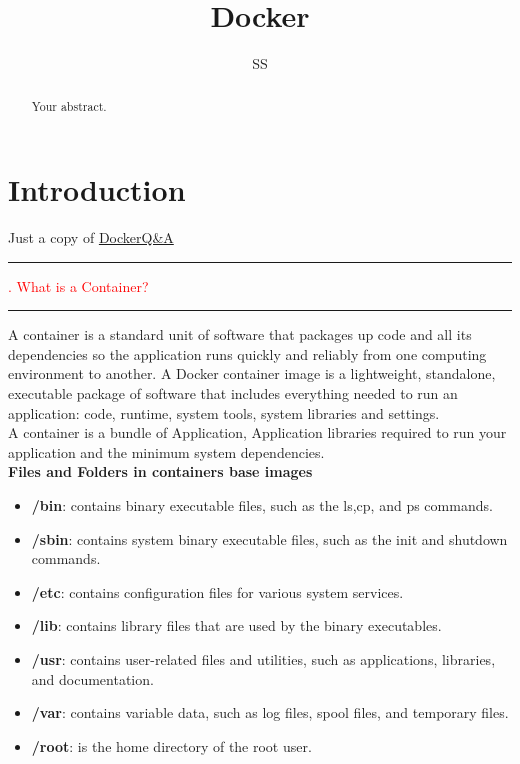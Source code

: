 \documentclass{article}
\title{Docker}
\author{SS}
\begin{document}
\maketitle

\begin{abstract}
Your abstract.
\end{abstract}

\section{Introduction}

Just a copy of \href{https://github.com/Devinterview-io/docker-interview-questions}{DockerQ\&A} \\
% 
\noindent
{\color{red} \rule{\linewidth}{0.5mm}}
\textcolor{red}{. What is a Container?} \\
\noindent
{\color{red} \rule{\linewidth}{0.5mm}}
A container is a standard unit of software that packages up code and all its dependencies so the application runs quickly and reliably from one computing environment to another. A Docker container image is a lightweight, standalone, executable package of software that includes everything needed to run an application: code, runtime, system tools, system libraries and settings. \\
A container is a bundle of Application, Application libraries required to run your application and the minimum system dependencies.  
\\
\textbf{Files and Folders in containers base images}
\begin{itemize}
\color{blue}
\item \textbf{/bin}: contains binary executable files, such as the ls,cp, and ps commands.
\item \textbf{/sbin}: contains system binary executable files, such as the init and shutdown commands.
\item \textbf{/etc}: contains configuration files for various system services.
\item \textbf{/lib}: contains library files that are used by the binary executables.
\item \textbf{/usr}: contains user-related files and utilities, such as applications, libraries, and documentation.
\item \textbf{/var}: contains variable data, such as log files, spool files, and temporary files.
\item \textbf{/root}: is the home directory of the root user.
\end{itemize}
\end{document}
